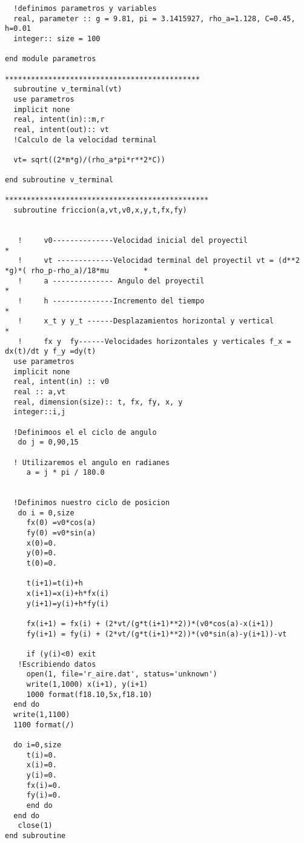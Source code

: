 \documentclass[12pt,a4paper,twoside]{article}
\begin{document}
\begin{verbatim}
  !definimos parametros y variables 
  real, parameter :: g = 9.81, pi = 3.1415927, rho_a=1.128, C=0.45, h=0.01
  integer:: size = 100
    
end module parametros

*********************************************
  subroutine v_terminal(vt)
  use parametros 
  implicit none 
  real, intent(in)::m,r
  real, intent(out):: vt
  !Calculo de la velocidad terminal
  
  vt= sqrt((2*m*g)/(rho_a*pi*r**2*C))

end subroutine v_terminal

***********************************************
  subroutine friccion(a,vt,v0,x,y,t,fx,fy)

    
   !     v0--------------Velocidad inicial del proyectil                                             *
   !     vt -------------Velocidad terminal del proyectil vt = (d**2 *g)*( rho_p-rho_a)/18*mu        *
   !     a -------------- Angulo del proyectil                                                       *
   !     h --------------Incremento del tiempo                                                       *
   !     x_t y y_t ------Desplazamientos horizontal y vertical                                       *
   !     fx y  fy------Velocidades horizontales y verticales f_x = dx(t)/dt y f_y =dy(t)           
  use parametros 
  implicit none
  real, intent(in) :: v0
  real :: a,vt
  real, dimension(size):: t, fx, fy, x, y
  integer::i,j

  !Definimoos el el ciclo de angulo
   do j = 0,90,15

  ! Utilizaremos el angulo en radianes
     a = j * pi / 180.0
  
    
  !Definimos nuestro ciclo de posicion 
   do i = 0,size
     fx(0) =v0*cos(a)
     fy(0) =v0*sin(a)
     x(0)=0.
     y(0)=0.
     t(0)=0.   

     t(i+1)=t(i)+h
     x(i+1)=x(i)+h*fx(i)
     y(i+1)=y(i)+h*fy(i)

     fx(i+1) = fx(i) + (2*vt/(g*t(i+1)**2))*(v0*cos(a)-x(i+1))
     fy(i+1) = fy(i) + (2*vt/(g*t(i+1)**2))*(v0*sin(a)-y(i+1))-vt
     
     if (y(i)<0) exit 
   !Escribiendo datos 
     open(1, file='r_aire.dat', status='unknown')
     write(1,1000) x(i+1), y(i+1)
     1000 format(f18.10,5x,f18.10)
  end do 
  write(1,1100)
  1100 format(/)
 
  do i=0,size
     t(i)=0.
     x(i)=0.
     y(i)=0.
     fx(i)=0.
     fy(i)=0.
     end do
  end do 
   close(1)
end subroutine 

\end{verbatim}
\end{document}
